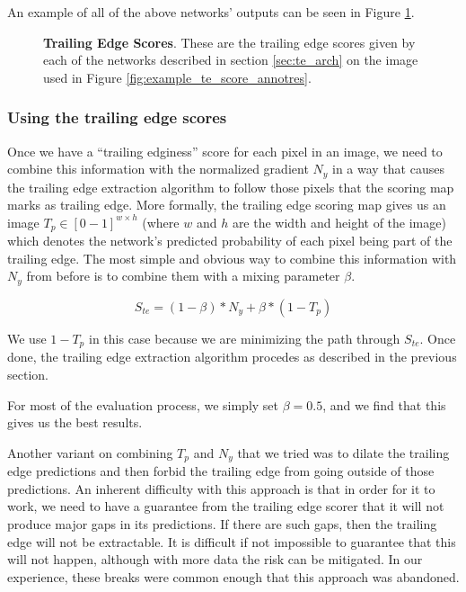 An example of all of the above networks' outputs can be seen in Figure \ref{fig:example_te_scores_all}.

\begin{figure}[t]%
\centering
{}
\newline
{}
\caption{\textbf{Trailing Edge Scores}. These are the trailing edge scores given by each of the networks described in section \ref{sec:te_arch} on the image used in Figure \ref{fig:example_te_score_annotres}.}
\label{fig:example_te_scores_all}
\end{figure}

\subsubsection{Using the trailing edge scores}

Once we have a ``trailing edginess'' score for each pixel in an image, we need to combine this information with the normalized gradient $N_y$ in a way that causes the trailing edge extraction algorithm to follow those pixels that the scoring map marks as trailing edge.
More formally, the trailing edge scoring map gives us an image $T_p \in [0-1]^{w \times h}$ (where $w$ and $h$ are the width and height of the image) which denotes the network's predicted probability of each pixel being part of the trailing edge.
The most simple and obvious way to combine this information with $N_y$ from before is to combine them with a mixing parameter $\beta$.

\begin{equation}
S_{te} = (1 - \beta)*N_y + \beta*(1 - T_p)
\end{equation}

We use $1 - T_p$ in this case because we are minimizing the path through $S_{te}$.
Once done, the trailing edge extraction algorithm procedes as described in the previous section.

For most of the evaluation process, we simply set $\beta = 0.5$, and we find that this gives us the best results.

Another variant on combining $T_p$ and $N_y$ that we tried was to dilate the trailing edge predictions and then forbid the trailing edge from going outside of those predictions.
An inherent difficulty with this approach is that in order for it to work, we need to have a guarantee from the trailing edge scorer that it will not produce major gaps in its predictions.
If there are such gaps, then the trailing edge will not be extractable.
It is difficult if not impossible to guarantee that this will not happen, although with more data the risk can be mitigated.
In our experience, these breaks were common enough that this approach was abandoned.

